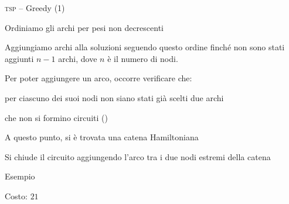 \begin{frame}{\textsc{tsp} -- Greedy (1)}

\vspace{-9pt}
\begin{myboxtitle}
\BIL
\item Ordiniamo gli archi per pesi non decrescenti
\item Aggiungiamo archi alla soluzioni seguendo questo ordine finché non 
  sono stati aggiunti $n-1$ archi, dove $n$ è il numero di nodi.
\item Per poter aggiungere un arco, occorre verificare che:
  \BI
  \item per ciascuno dei suoi nodi non siano stati già scelti due archi
  \item che non si formino circuiti (\mfset)
  \EI
\item A questo punto, si è trovata una catena Hamiltoniana
\item Si chiude il circuito aggiungendo l'arco tra i due nodi estremi della catena
\EIL
\end{myboxtitle}

\end{frame}


\begin{frame}{Esempio}


\alert{
\bigskip
{}Costo: $21$
}


\end{frame}

